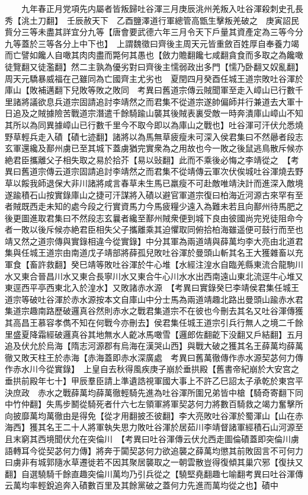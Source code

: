 　　九年春正月党項先内屬者皆叛歸吐谷渾三月庚辰洮州羌叛入吐谷渾殺刺史孔長秀【洮土刀翻】　壬辰赦天下　乙酉鹽澤道行軍總管高甑生擊叛羌破之　庚寅詔民貲分三等未盡其詳宜分九等【唐會要武德六年三月令天下戶量其資產定為三等今分九等蓋於三等各分上中下也】　上謂魏徵曰齊後主周天元皆重斂百姓厚自奉養力竭而亡譬如饞人自噉其肉肉盡而斃何其愚也【斂力贍翻饞七咸翻貪食而多取之為饞噉徒覽翻又徒濫翻】然二主孰為優劣對曰齊後主懦弱政出多門【懦乃卧翻又奴亂翻】周天元驕暴威福在己雖同為亡國齊主尤劣也　夏閏四月癸酉任城王道宗敗吐谷渾於庫山【敗補邁翻下兒敗等敗之敗同　考異曰舊道宗傳云賊聞軍至走入嶂山已行數千里諸將議欲息兵道宗固請追討李靖然之而君集不從道宗遂帥偏師并行兼道去大軍十日追及之賊據險苦戰道宗潛遣千餘騎踰山襲其後賊表裏受敵一時奔潰庫山嶂山不知其所以為同異據嶂山已行數千里今不取今即以為庫山之戰也】吐谷渾可汗伏允悉燒野草輕兵走入磧【磧七迹翻】諸將以為馬無草疲瘦未可深入侯君集曰不然曏者段志玄軍還纔及鄯州虜已至其城下蓋虜猶完實衆為之用故也今一敗之後鼠逃鳥散斥候亦絶君臣攜離父子相失取之易於拾芥【易以䜴翻】此而不乘後必悔之李靖從之　【考異曰舊道宗傳云道宗固請追討李靖然之而君集不從靖傳云軍次伏俟城吐谷渾燒去野草以餒我師退保大非川諸將咸言春草未生馬已羸瘦不可赴敵唯靖決計而進深入敵境遂踰積石山按實錄庫山之捷可汗謀將入磧以避官軍道宗復曰柏海近河源古來罕有至者賊既西走未知的處今段之行實資馬力今馬疲糧少遠入為難未若且向鄯州待馬肥之後更圖進取君集曰不然段志玄曩者纔至鄯州賊衆便到城下良由彼國尚完兇徒阻命今者一敗以後斥候亦絶君臣相失父子攜離乘其迫懼取同俯拾柏海雖遥便可鼓行而至也靖又然之道宗傳與實錄相違今從實錄】中分其軍為兩道靖與薛萬均李大亮由北道君集與任城王道宗由南道戊子靖部將薛孤兒敗吐谷渾於曼頭山斬其名王大獲雜畜以充軍食【畜許救翻】癸巳靖等敗吐谷渾於牛心堆【水經注湟水自臨羌縣東流合龍駒川水又東合晉昌川水又東合長寧川水又東合牛心川水水出西南遠山東北流逕牛心堆又東逕西平亭西東北入於湟水】又敗諸赤水源　【考異曰實錄癸巳李靖侯君集任城王道宗等破吐谷渾於赤水源按本文自庫山中分士馬為兩道靖趣北路出曼頭山踰赤水君集道宗趣南路歷破邏真谷然則赤水之戰君集道宗不在彼也今刪去其名又吐谷渾傳獲其高昌王慕容孝儁不知在何戰今亦刪去】侯君集任城王道宗引兵行無人之境二千餘里盛夏降霜經破邏真谷其地無水人齕冰馬噉雪【邏郎佐翻齕下没翻又戶結翻】五月追及伏允於烏海【隋志河源郡有烏海在漢哭山西】與戰大破之獲其名王薛萬均薛萬徹又敗天柱王於赤海【赤海蓋即赤水深廣處　考異曰舊萬徹傳作赤水源契苾何力傳作赤水川今從實錄】　上皇自去秋得風疾庚子崩於垂拱殿【舊書帝紀崩於大安宫之垂拱前殿年七十】甲辰羣臣請上準遺誥視軍國大事上不許乙巳詔太子承乾於東宫平決庶政　赤水之戰薛萬均薛萬徹輕騎先進為吐谷渾所圍兄弟皆中槍【騎奇寄翻下同中竹仲翻】失馬步鬭從騎死者什六七左領軍將軍契苾何力將數百騎救之竭力奮擊所向披靡萬均萬徹由是得免【從才用翻披丕彼翻】李大亮敗吐谷渾於蜀渾山【山在赤海西】獲其名王二十人將軍執失思力敗吐谷渾於居茹川李靖督諸軍經積石山河源至且末窮其西境聞伏允在突倫川　【考異曰吐谷渾傳云伏允西走圖倫磧蓋即突倫川虜語轉耳今從契苾何力傳】將奔于闐契苾何力欲追襲之薛萬均懲其前敗固言不可何力曰虜非有城郭隨水草遷徙若不因其聚居襲取之一朝雲散豈得復傾其巢穴邪【復扶又翻】自選驍騎千餘直趣突倫川萬均乃引兵從之【驍堅堯翻趣七喻翻考異曰吐谷渾傳云萬均率輕銳追奔入磧數百里及其餘黨破之蓋何力先進而萬均從之也】磧中

